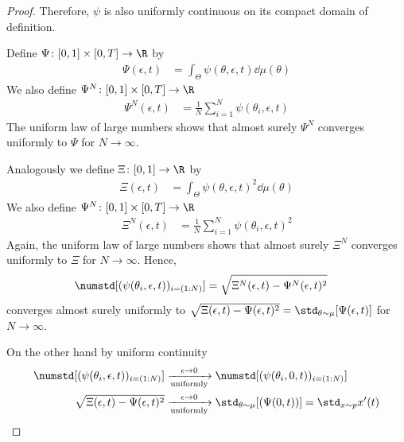 \begin{proof}
Therefore, $\psi$ is also uniformly continuous on its compact domain of definition.

Define $\Psi\colon[0,1]\times[0,T]\to \R$ by
%
\begin{align}
	\Psi(\epsilon, t) &= \int_{\Theta} \psi(\theta, \epsilon, t) \dd{\mu(\theta)}
\end{align}
%
We also define $\Psi^N\colon[0,1]\times[0,T]\to \R$
%
\begin{align}
	\Psi^N(\epsilon, t) &= \frac{1}{N} \sum_{i=1}^{N}\psi(\theta_i, \epsilon, t)
\end{align}
%
The uniform law of large numbers shows that almost surely  $\Psi^N$ converges uniformly
to $\Psi$ for $N\to\infty$.

Analogously we define $\Xi\colon[0,1]\to \R$ by
%
\begin{align}
	\Xi(\epsilon, t) &= \int_{\Theta} \psi(\theta, \epsilon, t)^2 \dd{\mu(\theta)}
\end{align}
%
We also define $\Psi^N\colon[0,1]\times[0,T]\to \R$
%
\begin{align}
	\Xi^N(\epsilon, t) &= \frac{1}{N} \sum_{i=1}^{N}\psi(\theta_i, \epsilon, t)^2
\end{align}
%
Again, the uniform law of large numbers shows that almost surely  $\Xi^N$ converges uniformly
to $\Xi$ for $N\to\infty$. Hence,
%
\begin{align}
	\numstd[(\psi(\theta_i,\epsilon,t))_{i=(1:N)}]
	&= \sqrt{\Xi^N(\epsilon,t)-\Psi^N(\epsilon, t)^2}
\end{align}
%
converges almost surely uniformly to $\sqrt{\Xi(\epsilon, t)-\Psi(\epsilon, t)^2}=\std_{\theta\sim \mu}[\Psi(\epsilon,t)]$ for $N\to\infty$.


On the other hand  by uniform continuity
%
\begin{align}
	\numstd[(\psi(\theta_i,\epsilon,t))_{i=(1:N)}]
	&\xrightarrow[\text{uniformly}]{\epsilon\to 0} \numstd[(\psi(\theta_i,0,t))_{i=(1:N)}]
\\	\sqrt{\Xi(\epsilon, t)-\Psi(\epsilon, t)^2}
	&\xrightarrow[\text{uniformly}]{\epsilon\to 0} \std_{\theta\sim \mu}[(\Psi(0,t))]
	= \std_{x\sim p} x'(t)
\end{align}


\end{proof}
